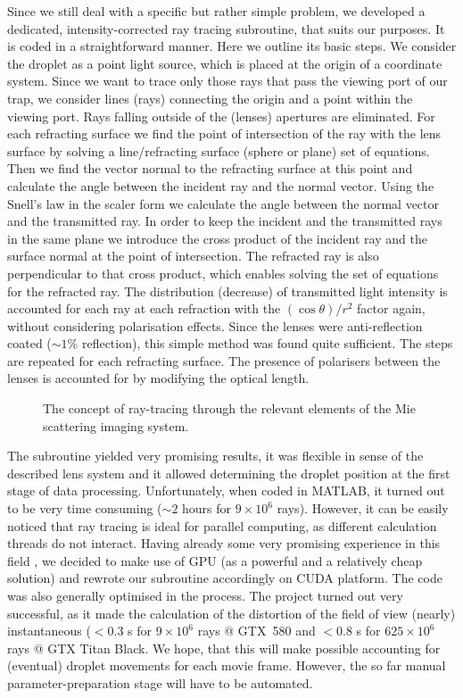 \documentclass[preprint,review,12pt,dvips]{elsarticle}
\begin{document}
Since we still deal with a specific but rather simple problem, we developed a dedicated, intensity-corrected ray tracing
subroutine, that suits our purposes. It is coded in a straightforward manner. Here we outline its basic steps. We consider
the droplet as a point light source, which is placed at the origin of a coordinate system. Since we want to trace only
those rays that pass the viewing port of our trap, we consider lines (rays) connecting the origin and a point within the
viewing port. Rays falling outside of the (lenses) apertures are eliminated. For each refracting surface we find the point
of intersection of the ray with the lens surface by solving a line/refracting surface (sphere or plane) set of equations.
Then we find the vector normal to the refracting surface at this point and calculate the angle between the incident ray
and the normal vector. Using the Snell's law in the scaler form we calculate the angle between the normal vector and the
transmitted ray. In order to keep the incident and the transmitted rays in the same plane we introduce the cross product
of the incident ray and the surface normal at the point of intersection. The refracted ray is also perpendicular to that
cross product, which enables solving the set of equations for the refracted ray. The distribution (decrease) of
transmitted light intensity is accounted for each ray at each refraction with the $(\cos \theta) /r^2$ factor again,
without considering polarisation effects. Since the lenses were anti-reflection coated ($\sim 1$\% reflection), this
simple method was found quite sufficient. The steps are repeated for each refracting surface. The presence of polarisers
between the lenses is accounted for by modifying the optical length.
\begin{figure}[h!t!b!]
\begin{center}
\end{center}
\caption{The concept of ray-tracing through the relevant elements of the Mie scattering imaging
system.}\label{ray-tracing}
\end{figure}

The subroutine yielded very promising results, it was flexible in sense of the described lens system and it allowed
determining the droplet position at the first stage of data processing. Unfortunately, when coded in MATLAB, it turned out
to be very time consuming ($\sim 2$ hours for $9\times 10^6$ rays). However, it can be easily noticed that ray tracing is
ideal for parallel computing, as different calculation threads do not interact. Having already some very promising
experience in this field \cite{Smigacz}, we decided to make use of GPU (as a powerful and a relatively cheap solution) and
rewrote our subroutine accordingly on CUDA platform. The code was also generally optimised in the process. The project
turned out very successful, as it made the calculation of the distortion of the field of view (nearly) instantaneous
($<0.3$ s for $9\times 10^6$ rays @ GTX~580 and $<0.8$ s for $625\times 10^6$ rays @ GTX Titan Black. We hope, that this
will make possible accounting for (eventual) droplet movements for each movie frame. However, the so far manual
parameter-preparation stage will have to be automated.
\end{document}
